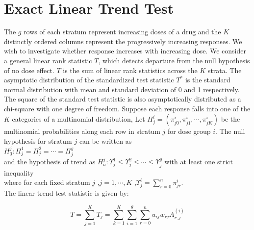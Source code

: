 \documentclass[12pt,oneside]{report}
\theoremstyle{definition}
\theoremstyle{mystyle}
\begin{document}
\section{Exact Linear Trend Test}

The  $g$ rows of each stratum represent increasing doses of a drug and the $K$ distinctly ordered  columns represent the progressively increasing  responses. We wish to investigate whether response increases with increasing dose. We consider a general linear rank statistic $T$, which detects departure from the null hypothesis of no dose effect. $T$    is  the sum of  linear rank statistics across the  $K$ strata. The asymptotic distribution of the standardized test statistic $T^{*}$ is the standard normal distribution with mean and standard deviation of 0 and 1 respectively. The square of the standard test statistic is also asymptotically distributed as a chi-square with one degree of freedom. Suppose each response falls into one of the $K$  categories of a multinomial distribution, Let $\Pi^{i}_{j}=(\pi_{j0}^{i},\pi_{j1}^{i},\cdots,\pi_{jK}^{i} )$  be the multinomial probabilities along each row in  stratum  $j$ for dose group $i$. The null hypothesis for  stratum $j$  can be written as\\
$\displaystyle H^{j}_{0}:\Pi_{j}^{1} =\Pi_{j}^{2}= \cdots =\Pi_{j}^{g}$\\
and the hypothesis of trend as
$H^{j}_{a}: \Upsilon_{j}^{1} \leq \Upsilon_{j}^{2}\leq \cdots \leq \Upsilon_{j}^{g} $
\hspace{3mm} with at least one strict inequality\\
where for each fixed stratum $j$ ,$j=1,\cdots,K$ ,$\Upsilon_{j}^{i}=\sum\limits_{r=0}^{n}\pi_{jr}^{i}$.\\
The  linear trend test statistic is given by:

\begin{equation}\label{ltt1}
T=\sum\limits_{j=1}^{K}T_{j}=\sum\limits_{k=1}^{K}\sum\limits_{i=1}^{g}\sum\limits_{r=0}^{n}u_{ij}w_{rj}A_{r,j}^{(i)}
\end{equation}
\end{document}
